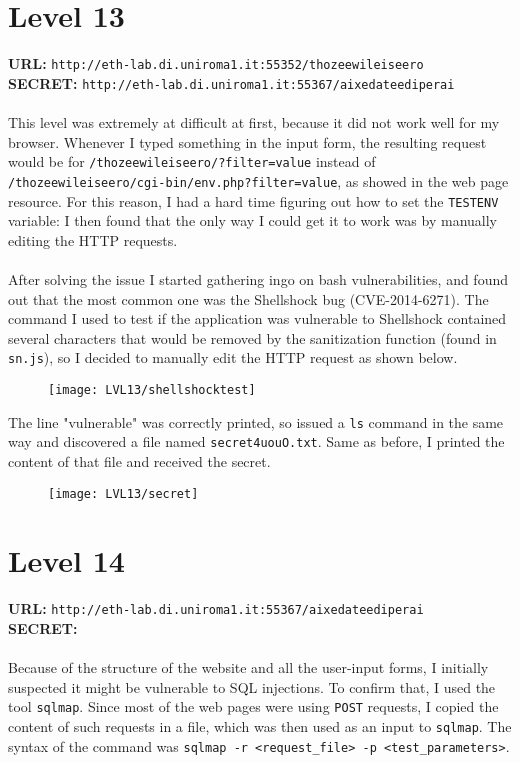 \documentclass[12pt,a4paper]{article}
\begin{document}
	\section*{Level 13}
	\textbf{URL: }\texttt{http://eth-lab.di.uniroma1.it:55352/thozeewileiseero}\\
	\textbf{SECRET: }\texttt{http://eth-lab.di.uniroma1.it:55367/aixedateediperai}\\\\
	This level was extremely at difficult at first, because it did not work well for my browser. Whenever I typed something in the input form, the resulting request would be for \texttt{/thozeewileiseero/?filter=value} instead of \texttt{/thozeewileiseero/cgi-bin/env.php?filter=value}, as showed in the web page resource. For this reason, I had a hard time figuring out how to set the \texttt{TESTENV} variable: I then found that the only way I could get it to work was by manually editing the HTTP requests.\\\\After solving the issue I started gathering ingo on bash vulnerabilities, and found out that the most common one was the Shellshock bug (CVE-2014-6271).
	The command I used to test if the application was vulnerable to Shellshock contained several characters that would be removed by the sanitization function (found in \texttt{sn.js}), so I decided to manually edit the HTTP request as shown below.
	\begin{figure}[H]
		\centering
		\texttt{[image: LVL13/shellshocktest]}
		\label{fig:test13}
	\end{figure}
	The line "vulnerable" was correctly printed, so issued a \texttt{ls} command in the same way and discovered a file named \texttt{secret4uouO.txt}. Same as before, I printed the content of that file and received the secret.
	\begin{figure}[H]
		\centering
		\texttt{[image: LVL13/secret]}
		\label{fig:secret13}
	\end{figure}
	
	\section*{Level 14}
	\textbf{URL: }\texttt{http://eth-lab.di.uniroma1.it:55367/aixedateediperai}\\
	\textbf{SECRET: }\texttt{}\\\\
	Because of the structure of the website and all the user-input forms, I initially suspected it might be vulnerable to SQL injections. To confirm that, I used the tool \texttt{sqlmap}. Since most of the web pages were using \texttt{POST} requests, I copied the content of such requests in a file, which was then used as an input to \texttt{sqlmap}. The syntax of the command was \texttt{sqlmap -r <request\_file> -p <test\_parameters>}. 
\end{document}
